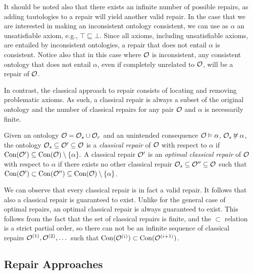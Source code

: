 \begin{example}
\end{example}

It should be noted also that there exists an infinite number of possible repairs, as adding tautologies to a repair will yield another valid repair. In the case that we are interested in making an inconsistent ontology consistent, we can use as $\alpha$ an unsatisfiable axiom, e.g., $\top \sqsubseteq \bot$. Since all axioms, including unsatisfiable axioms, are entailed by inconsistent ontologies, a repair that does not entail $\alpha$ is consistent. Notice also that in this case where $\mathcal{O}$ is inconsistent, any consistent ontology that does not entail $\alpha$, even if completely unrelated to $\mathcal{O}$, will be a repair of $\mathcal{O}$.

In contrast, the classical approach to repair consists of locating and removing problematic axioms. As such, a classical repair is always a subset of the original ontology and the number of classical repairs for any pair $\mathcal{O}$ and $\alpha$ is necessarily finite.

\begin{definition}
Given an ontology $\mathcal{O} = \mathcal{O}_s \cup \mathcal{O}_r$ and an unintended consequence $\mathcal{O} \vDash \alpha$, $\mathcal{O}_s \not\vDash \alpha$, the ontology $\mathcal{O}_s \subseteq \mathcal{O}' \subseteq \mathcal{O}$ is a \emph{classical repair} of $\mathcal{O}$ with respect to $\alpha$ if $\mathrm{Con}(\mathcal{O}') \subseteq \mathrm{Con}(\mathcal{O}) \setminus \{\alpha\}.$ A classical repair $\mathcal{O}'$ is an \emph{optimal classical repair} of $\mathcal{O}$ with respect to $\alpha$ if there exists no other classical repair $\mathcal{O}_s \subseteq \mathcal{O}'' \subseteq \mathcal{O}$ such that $\mathrm{Con}(\mathcal{O}') \subset \mathrm{Con}(\mathcal{O}'') \subseteq \mathrm{Con}(\mathcal{O}) \setminus \{\alpha\}$.
\end{definition}

We can observe that every classical repair is in fact a valid repair. It follows that also a classical repair is guaranteed to exist. Unlike for the general case of optimal repairs, an optimal classical repair is always guaranteed to exist. This follows from the fact that the set of classical repairs is finite, and the $\subset$ relation is a strict partial order, so there can not be an infinite sequence of classical repairs $\mathcal{O}^{(1)}, \mathcal{O}^{(2)}, \dots$  such that $\mathrm{Con}(\mathcal{O}^{(i)}) \subset \mathrm{Con}(\mathcal{O}^{(i + 1)})$.

\subsection{Repair Approaches} \label{repair-approaches}

